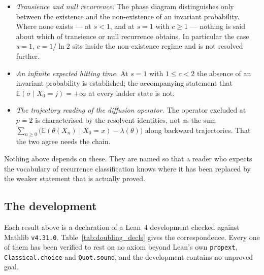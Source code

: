 \begin{itemize}
  \item \emph{Transience and null recurrence.} The phase diagram distinguishes only between the
        existence and the non-existence of an invariant probability. Where none exists --- at
        $s<1$, and at $s=1$ with $c\geq1$ --- nothing is said about which of transience or null
        recurrence obtains. In particular the case $s=1$, $c=1/\ln2$ sits inside the
        non-existence regime and is not resolved further.
  \item \emph{An infinite expected hitting time.} At $s=1$ with $1\leq c<2$ the absence of an
        invariant probability is established; the accompanying statement that
        $\mathbb E(\sigma\mid X_0=j)=+\infty$ at every ladder state is not.
  \item \emph{The trajectory reading of the diffusion operator.} The operator excluded at $p=2$
        is characterised by the resolvent identities, not as the sum
        $\sum_{n\geq0}\bigl(\mathbb E(\theta(X_n)\mid X_0=x)-\lambda(\theta)\bigr)$ along
        backward trajectories. That the two agree needs the chain.
\end{itemize}

\noindent
Nothing above depends on these. They are named so that a reader who expects the vocabulary of
recurrence classification knows where it has been replaced by the weaker statement that is
actually proved.


\subsection{The development}\label{sec:doubling_development}

Each result above is a declaration of a Lean~4 development checked against Mathlib
\texttt{v4.31.0}. Table~\ref{tab:doubling_decls} gives the correspondence. Every one of them
has been verified to rest on no axiom beyond Lean's own \texttt{propext},
\texttt{Classical.choice} and \texttt{Quot.sound}, and the development contains no unproved
goal.

